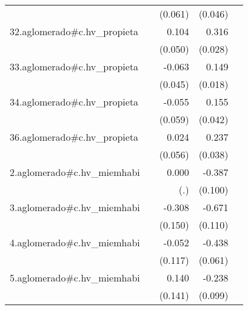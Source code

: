 {\begin{longtable}{l*{4}{D{.}{.}{-1}}}
            &                     &     (0.061)         &     (0.046)         &                     \\
\addlinespace
32.aglomerado#c.hv\_propieta&                     &       0.104\sym{*}  &       0.316\sym{***}&                     \\
            &                     &     (0.050)         &     (0.028)         &                     \\
\addlinespace
33.aglomerado#c.hv\_propieta&                     &      -0.063         &       0.149\sym{***}&                     \\
            &                     &     (0.045)         &     (0.018)         &                     \\
\addlinespace
34.aglomerado#c.hv\_propieta&                     &      -0.055         &       0.155\sym{***}&                     \\
            &                     &     (0.059)         &     (0.042)         &                     \\
\addlinespace
36.aglomerado#c.hv\_propieta&                     &       0.024         &       0.237\sym{***}&                     \\
            &                     &     (0.056)         &     (0.038)         &                     \\
\addlinespace
2.aglomerado#c.hv\_miemhabi&                     &       0.000         &      -0.387\sym{***}&                     \\
            &                     &         (.)         &     (0.100)         &                     \\
\addlinespace
3.aglomerado#c.hv\_miemhabi&                     &      -0.308\sym{*}  &      -0.671\sym{***}&                     \\
            &                     &     (0.150)         &     (0.110)         &                     \\
\addlinespace
4.aglomerado#c.hv\_miemhabi&                     &      -0.052         &      -0.438\sym{***}&                     \\
            &                     &     (0.117)         &     (0.061)         &                     \\
\addlinespace
5.aglomerado#c.hv\_miemhabi&                     &       0.140         &      -0.238\sym{*}  &                     \\
            &                     &     (0.141)         &     (0.099)         &                     \\

\end{longtable}}
